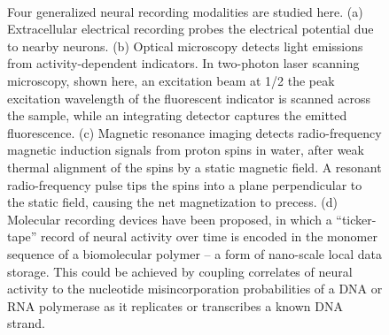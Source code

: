 \begin{figure}[htbp]
\centering
\caption{Four generalized neural recording modalities are studied here. (a) Extracellular electrical recording probes the electrical potential due to nearby neurons. (b) Optical microscopy detects light emissions from activity-dependent indicators. In two-photon laser scanning microscopy, shown here, an excitation beam at 1/2 the peak excitation wavelength of the fluorescent indicator is scanned across the sample, while an integrating detector captures the emitted fluorescence. (c) Magnetic resonance imaging detects radio-frequency magnetic induction signals from proton spins in water, after weak thermal alignment of the spins by a static magnetic field. A resonant radio-frequency pulse tips the spins into a plane perpendicular to the static field, causing the net magnetization to precess. (d) Molecular recording devices have been proposed, in which a “ticker-tape” record of neural activity over time is encoded in the monomer sequence of a biomolecular polymer – a form of nano-scale local data storage. This could be achieved by coupling correlates of neural activity to the nucleotide misincorporation probabilities of a DNA or RNA polymerase as it replicates or transcribes a known DNA strand.}  \label{fig:modalities}
\hspace{0.1in}
\\

\end{figure}

